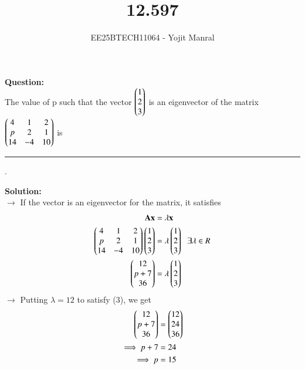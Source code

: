 \documentclass[journal]{IEEEtran}
\begin{document}

\vspace{3cm}

\title{12.597}
\author{EE25BTECH11064 - Yojit Manral}

\maketitle
{\let\newpage\relax\maketitle}
\renewcommand{\thefigure}{\theenumi}
\renewcommand{\thetable}{\theenumi}
\setlength{\intextsep}{10pt} %

\textbf{Question:}\\
The value of p such that the vector $\begin{pmatrix}1\\2\\3\end{pmatrix}$ is an eigenvector of the matrix $\begin{pmatrix}4&1&2\\p&2&1\\14&-4&10\end{pmatrix}$ is \rule{0.5cm}{0.15mm} .

\textbf{Solution:}\\
$\rightarrow$ If the vector is an eigenvector for the matrix, it satisfies
\begin{align}
    \mathbf{A}\mathbf{x} &= \lambda\mathbf{x} \\
    \begin{pmatrix}4&1&2\\p&2&1\\14&-4&10\end{pmatrix} \begin{pmatrix}1\\2\\3\end{pmatrix} &= \lambda \begin{pmatrix}1\\2\\3\end{pmatrix} \hspace{0.2cm} \exists \lambda \in R \\
    \begin{pmatrix}12\\p+7\\36\end{pmatrix} &= \lambda \begin{pmatrix}1\\2\\3\end{pmatrix}
\end{align}
$\rightarrow$ Putting $\lambda = 12$ to satisfy (3), we get
\begin{align}
    \begin{pmatrix}12\\p+7\\36\end{pmatrix} &= \begin{pmatrix}12\\24\\36\end{pmatrix} \\
    \implies p + 7 &= 24 \\
    \implies p &= 15
\end{align}
\end{document}
